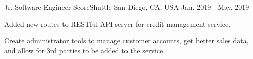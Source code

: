 \begin{cventries}
	\cventry
	{Jr. Software Engineer} %
	{ScoreShuttle} %
	{San Diego, CA, USA} %
	{Jan. 2019 - May. 2019} %
	{
		\begin{cvitems} %
			\item {Added new routes to RESTful API server for credit management service.}
			\item {Create administrator tools to manage customer accounts, get better sales data, and allow for 3rd parties to be added to the service.}
		\end{cvitems}
	}

\end{cventries}
